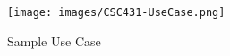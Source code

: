 \begin{figure}[h!]
  \begin{center}
    \caption{Sample Use Case}
    \label{}
    \texttt{[image: images/CSC431-UseCase.png]}
  \end{center}
\end{figure}
